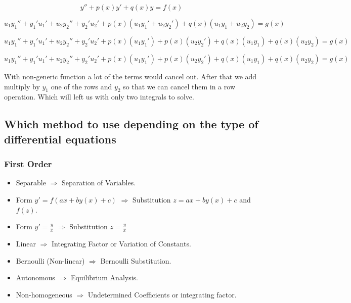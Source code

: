 \[
    y'' + p(x)y' + q(x)y = f(x)
\]

\[
    u_1 y_{1}'' + y_{1}' u_{1}'  + u_2 y_{2}'' + y_{2}' u_{2}' + p(x)(u_1 y_{1}' +  u_2 y_{2}') 
    + q(x)(u_1 y_1 + u_2 y_2) = g(x)  
\]

\[
    u_1 y_{1}'' + y_{1}' u_{1}'  + u_2 y_{2}'' + y_{2}' u_{2}' + p(x)(u_1 y_{1}') + p(x)(u_2 y_{2}') 
    + q(x)(u_1 y_1) + q(x)(u_2 y_2) = g(x)  
\]

\[
    u_1 y_{1}'' + y_{1}' u_{1}'  + u_2 y_{2}'' + y_{2}' u_{2}' + p(x)(u_1 y_{1}') + p(x)(u_2 y_{2}') 
    + q(x)(u_1 y_1) + q(x)(u_2 y_2) = g(x)  
\]

With non-generic function a lot of the terms would cancel out. After that we add multiply by
\(y_1\) one of the rows and \(y_2\) so that we can cancel them in a row operation. Which will left us
with only two integrals to solve.

\subsection{Which method to use depending on the type of differential equations}

\subsubsection{First Order}

\begin{itemize}

    \item Separable \(\Rightarrow\) Separation of Variables.

    \item Form \(y' = f(ax + by(x) + c)\) \(\Rightarrow\) Substitution \(z = ax + by(x) + c\) and \(f(z)\).

    \item Form \(y' = \frac{y}{x}\) \(\Rightarrow\) Substitution \(z = \frac{y}{x}\)

    \item Linear \(\Rightarrow\) Integrating Factor or Variation of Constants.

    \item Bernoulli (Non-linear) \(\Rightarrow\) Bernoulli Substitution.

    \item Autonomous \(\Rightarrow\) Equilibrium Analysis.

    \item Non-homogeneous \(\Rightarrow\) Undetermined Coefficients or integrating factor.

\end{itemize}

